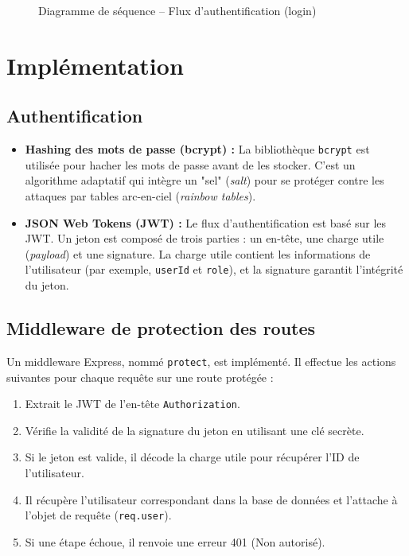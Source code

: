 \documentclass{report}
\begin{document}
\begin{figure}[H]
\caption{Diagramme de séquence -- Flux d'authentification (login)}
\label{fig:seq-login}
\end{figure}

\section{\color{SoftEspresso}Implémentation}
\subsection{\color{SoftEspresso}Authentification}
\begin{itemize}
    \item \textbf{\color{SoftEspresso}Hashing des mots de passe (bcrypt) :} La bibliothèque \texttt{bcrypt} est utilisée pour hacher les mots de passe avant de les stocker. C'est un algorithme adaptatif qui intègre un "sel" (\textit{salt}) pour se protéger contre les attaques par tables arc-en-ciel (\textit{rainbow tables}).
    \item \textbf{\color{SoftEspresso}JSON Web Tokens (JWT) :} Le flux d'authentification est basé sur les JWT. Un jeton est composé de trois parties : un en-tête, une charge utile (\textit{payload}) et une signature. La charge utile contient les informations de l'utilisateur (par exemple, \texttt{userId} et \texttt{role}), et la signature garantit l'intégrité du jeton.
\end{itemize}

\subsection{\color{SoftEspresso}Middleware de protection des routes}
Un middleware Express, nommé \texttt{protect}, est implémenté. Il effectue les actions suivantes pour chaque requête sur une route protégée :
\begin{enumerate}
    \item Extrait le JWT de l'en-tête \texttt{Authorization}.
    \item Vérifie la validité de la signature du jeton en utilisant une clé secrète.
    \item Si le jeton est valide, il décode la charge utile pour récupérer l'ID de l'utilisateur.
    \item Il récupère l'utilisateur correspondant dans la base de données et l'attache à l'objet de requête (\texttt{req.user}).
    \item Si une étape échoue, il renvoie une erreur 401 (Non autorisé).
\end{enumerate}
\end{document}

